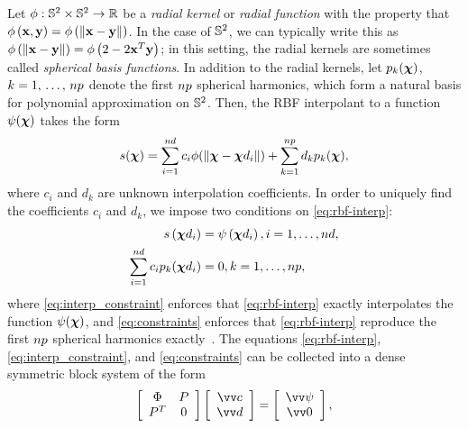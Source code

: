 Let $\phi : \mathbb{S}^2 \times \mathbb{S}^2 \to \mathbb{R}$ be a \emph{radial kernel} or \emph{radial function} with the property that $\phi\left({\bf x},{\bf y}\right) = \phi\left(\|{\bf x} - {\bf y}\|\right)$. In the case of $\mathbb{S}^2$, we can typically write this as $\phi\left(\|{\bf x} - {\bf y}\|\right) = \phi\left(2 - 2 {\bf x}^T {\bf y}\right)$; in this setting, the radial kernels are sometimes called \emph{spherical basis functions}. In addition to the radial kernels, let $p_k(\boldsymbol{\chi})$,
$k=1,\,\ldots,\,\poly\cardinality$ denote the first $\poly \cardinality$ spherical harmonics, which form a natural basis for polynomial approximation on $\mathbb{S}^2$. Then, the RBF interpolant to a function $\psi(\boldsymbol{\chi})$ takes the form
\begin{equation}\label{eq:rbf-interp}
    s(\Xp)
    = \sum_{i=1}^{\data\cardinality} c_i \phi(\|\Xp-\data\Xp_i\|)
    + \sum_{k=1}^{\poly\cardinality} d_k p_k(\Xp),
\end{equation}
where $c_i$ and $d_k$ are unknown interpolation coefficients. In order to uniquely find the coefficients $c_i$ and $d_k$, we impose two conditions on \eqref{eq:rbf-interp}:
\begin{align}
s\left(\data\Xp_i \right) &= \psi\left(\data\Xp_i\right), i=1,\ldots,\data\cardinality, \label{eq:interp_constraint}\\
\sum_{i=1}^{\data\cardinality} c_i p_k(\data\Xp_i) &= 0, k=1,\ldots,\poly\cardinality,\label{eq:constraints}
\end{align}
where \eqref{eq:interp_constraint} enforces that \eqref{eq:rbf-interp} exactly interpolates the function $\psi(\boldsymbol{\chi})$, and \eqref{eq:constraints} enforces that \eqref{eq:rbf-interp} reproduce the first $\poly\cardinality$ spherical harmonics exactly~\cite{Fasshauer:2007ui}. The equations \eqref{eq:rbf-interp}, \eqref{eq:interp_constraint}, and \eqref{eq:constraints} can be collected into a dense symmetric block system of the form
\begin{equation}\label{eq:rbf-interp-matrix}
    \left[\begin{array}{cc}
            \Phi & P \\ P^T & 0
    \end{array}\right]\left[\begin{array}{c}
            \arr{c} \\ \arr{d}
    \end{array}\right] = \left[\begin{array}{c}
            \arr{\psi} \\ \arr{0}
    \end{array}\right],
\end{equation}
